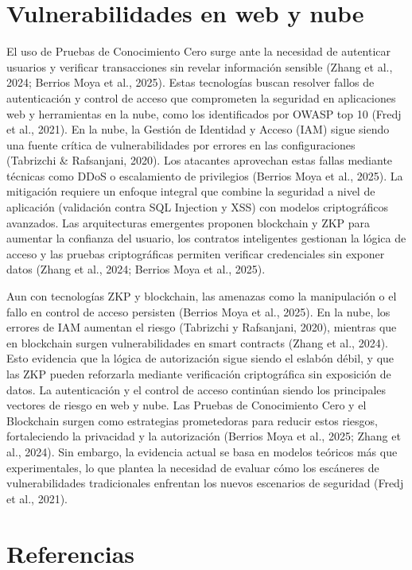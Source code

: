 \documentclass[conference]{IEEEtran}
\begin{document}
\section{Vulnerabilidades en web y nube}
El uso de Pruebas de Conocimiento Cero  surge ante la necesidad de autenticar usuarios y verificar transacciones sin revelar información sensible (Zhang et al., 2024; Berrios Moya et al., 2025). Estas tecnologías buscan resolver fallos de autenticación y control de acceso que comprometen la seguridad en aplicaciones web y herramientas en la nube, como los identificados por OWASP top 10 (Fredj et al., 2021). En la nube, la Gestión de Identidad y Acceso (IAM) sigue siendo una fuente crítica de vulnerabilidades por errores en las configuraciones (Tabrizchi & Rafsanjani, 2020). Los atacantes aprovechan estas fallas mediante técnicas como DDoS o escalamiento de privilegios (Berrios Moya et al., 2025). La mitigación requiere un enfoque integral que combine la seguridad a nivel de aplicación (validación contra SQL Injection y XSS) con modelos criptográficos avanzados. Las arquitecturas emergentes proponen blockchain y ZKP para aumentar la confianza del usuario, los contratos inteligentes gestionan la lógica de acceso y las pruebas criptográficas permiten verificar credenciales sin exponer datos (Zhang et al., 2024; Berrios Moya et al., 2025).


Aun con tecnologías ZKP y blockchain, las amenazas como la manipulación o el fallo en control de acceso persisten (Berrios Moya et al., 2025). En la nube, los errores de IAM aumentan el riesgo (Tabrizchi y Rafsanjani, 2020), mientras que en blockchain surgen vulnerabilidades en smart contracts (Zhang et al., 2024). Esto evidencia que la lógica de autorización sigue siendo el eslabón débil, y que las ZKP pueden reforzarla mediante verificación criptográfica sin exposición de datos. La autenticación y el control de acceso continúan siendo los principales vectores de riesgo en web y nube. Las Pruebas de Conocimiento Cero y el Blockchain surgen como estrategias prometedoras para reducir estos riesgos, fortaleciendo la privacidad y la autorización (Berrios Moya et al., 2025; Zhang et al., 2024). Sin embargo, la evidencia actual se basa en modelos teóricos más que experimentales, lo que plantea la necesidad de evaluar cómo los escáneres de vulnerabilidades tradicionales enfrentan los nuevos escenarios de seguridad (Fredj et al., 2021).


\section*{Referencias}
\end{document}
